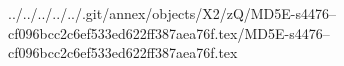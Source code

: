 ../../../../../.git/annex/objects/X2/zQ/MD5E-s4476--cf096bcc2c6ef533ed622ff387aea76f.tex/MD5E-s4476--cf096bcc2c6ef533ed622ff387aea76f.tex